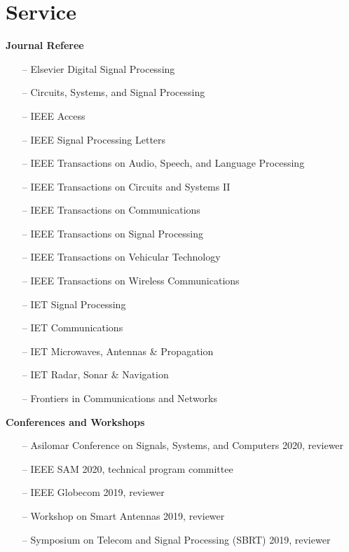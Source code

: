 \section{Service} 

{\bf Journal Referee}\\
\begin{itemize}
	\item[--] Elsevier Digital Signal Processing
	\item[--] Circuits, Systems, and Signal Processing
	\item[--] IEEE Access
	\item[--] IEEE Signal Processing Letters
	\item[--] IEEE Transactions on Audio, Speech, and Language Processing
	\item[--] IEEE Transactions on Circuits and Systems II
	\item[--] IEEE Transactions on Communications
	\item[--] IEEE Transactions on Signal Processing 
	\item[--] IEEE Transactions on Vehicular Technology
	\item[--] IEEE Transactions on Wireless Communications
	\item[--] IET Signal Processing
	\item[--] IET Communications
	\item[--] IET Microwaves, Antennas \& Propagation
	\item[--] IET Radar, Sonar \& Navigation
	\item[--] Frontiers in Communications and Networks 
\end{itemize}

{\bf Conferences and Workshops}\\
\begin{itemize}
	\item[--] Asilomar Conference on Signals, Systems, and Computers 2020, reviewer
	\item[--] IEEE SAM 2020, technical program committee
	\item[--] IEEE Globecom 2019, reviewer
	\item[--] Workshop on Smart Antennas 2019, reviewer
	\item[--] Symposium on Telecom and Signal Processing (SBRT) 2019, reviewer
\end{itemize}